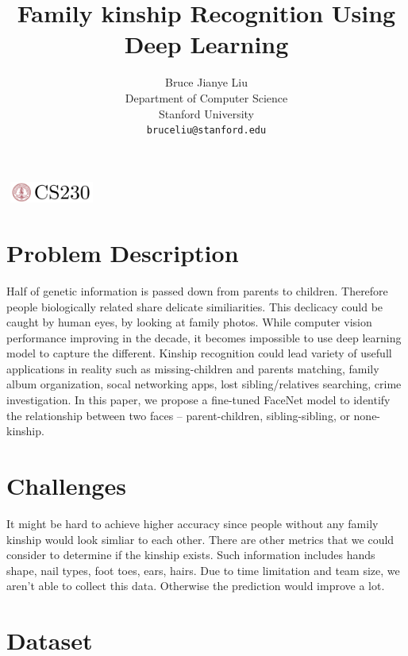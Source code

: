 \documentclass{article}
\title{Family kinship Recognition Using Deep Learning}
\author{
  Bruce Jianye Liu\\
  Department of Computer Science\\
  Stanford University\\
  \texttt{bruceliu@stanford.edu} \\
}
\begin{document}

\begin{center}
\includegraphics[width=3cm, height=0.7cm]{CS230}
\end{center}

\maketitle

\section{Problem Description}
Half of genetic information is passed down from parents to children. Therefore
people biologically related share delicate similiarities. This declicacy could
be caught by human eyes, by looking at family photos. While computer vision
performance improving in the decade, it becomes impossible to use deep learning
model to capture the different. Kinship recognition could lead variety of
usefull applications in reality such as missing-children and parents matching,
family album organization, socal networking apps, lost sibling/relatives
searching, crime investigation. In this paper, we propose a fine-tuned FaceNet
model to identify the relationship between two faces -- parent-children, sibling-sibling, or none-kinship.

\section{Challenges}
It might be hard to achieve higher accuracy since people without any family
kinship would look simliar to each other. There are other metrics that we could
consider to determine if the kinship exists. Such information includes hands
shape, nail types, foot toes, ears, hairs. Due to time limitation and team
size, we aren't able to collect this data. Otherwise the prediction would
improve a lot.

\section{Dataset}
\end{document}
